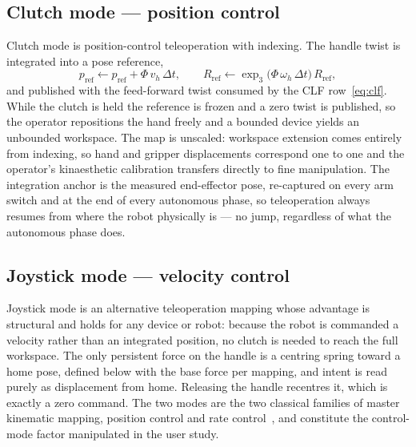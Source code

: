 \subsection{Clutch mode --- position control}
\label{sec:clutchmode}

Clutch mode is position-control teleoperation with indexing. The handle twist is integrated into a pose reference,
\begin{equation}
p_{\text{ref}} \leftarrow p_{\text{ref}} + \Phi\, v_h\,\Delta t,
\qquad
R_{\text{ref}} \leftarrow \exp_3\!\bigl(\Phi\,\omega_h\,\Delta t\bigr)\, R_{\text{ref}},
\label{eq:clutchint}
\end{equation}
and published with the feed-forward twist consumed by the CLF row~\eqref{eq:clf}. While the clutch is held the reference is frozen and a zero twist is published, so the operator repositions the hand freely and a bounded device yields an unbounded workspace. The map is unscaled: workspace extension comes entirely from indexing, so hand and gripper displacements correspond one to one and the operator's kinaesthetic calibration transfers directly to fine manipulation. The integration anchor is the measured end-effector pose, re-captured on every arm switch and at the end of every autonomous phase, so teleoperation always resumes from where the robot physically is --- no jump, regardless of what the autonomous phase does.

\subsection{Joystick mode --- velocity control}
\label{sec:joystick}

Joystick mode is an alternative teleoperation mapping whose advantage is structural and holds for any device or robot: because the robot is commanded a velocity rather than an integrated position, no clutch is needed to reach the full workspace. The only persistent force on the handle is a centring spring toward a home pose, defined below with the base force per mapping, and intent is read purely as displacement from home. Releasing the handle recentres it, which is exactly a zero command. The two modes are the two classical families of master kinematic mapping, position control and rate control~\cite{kim1987comparison}, and constitute the control-mode factor manipulated in the user study.

